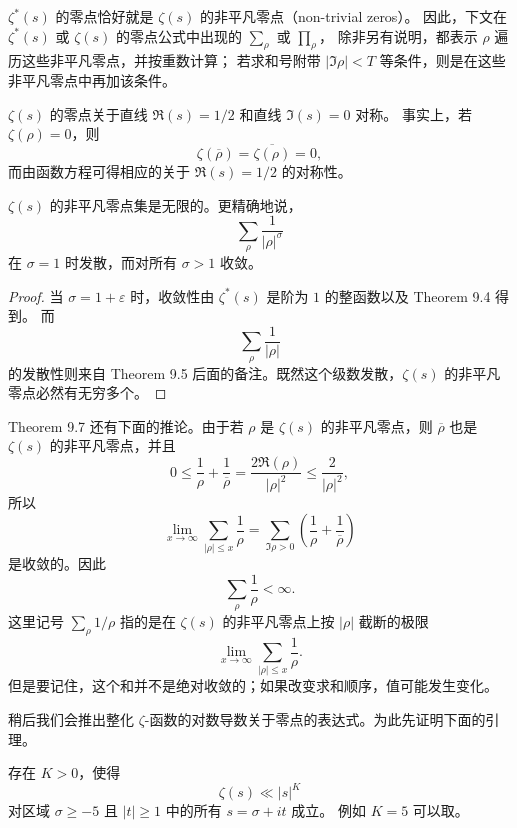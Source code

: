 \begin{remark}
	$\zeta^*(s)$ 的零点恰好就是 $\zeta(s)$ 的非平凡零点（non-trivial zeros）。
	因此，下文在 $\zeta^*(s)$ 或 $\zeta(s)$ 的零点公式中出现的 $\sum_\rho$ 或 $\prod_\rho$，
	除非另有说明，都表示 $\rho$ 遍历这些非平凡零点，并按重数计算；
	若求和号附带 $|\Im\rho|<T$ 等条件，则是在这些非平凡零点中再加该条件。
\end{remark}

\begin{remark}
	$\zeta(s)$ 的零点关于直线 $\Re(s)=1/2$ 和直线 $\Im(s)=0$ 对称。
	事实上，若 $\zeta(\rho)=0$，则
	\[
		\zeta(\overline{\rho})
		=
		\overline{\zeta(\rho)}
		=
		0,
	\]
	而由函数方程可得相应的关于 $\Re(s)=1/2$ 的对称性。
\end{remark}

\begin{theorem}[原文 Theorem 9.7]
	$\zeta(s)$ 的非平凡零点集是无限的。更精确地说，
	\[
		\sum_\rho \frac{1}{|\rho|^\sigma}
	\]
	在 $\sigma=1$ 时发散，而对所有 $\sigma>1$ 收敛。
\end{theorem}

\begin{proof}
	当 $\sigma=1+\varepsilon$ 时，收敛性由 $\zeta^*(s)$ 是阶为 $1$ 的整函数以及 Theorem 9.4 得到。
	而
	\[
		\sum_\rho \frac1{|\rho|}
	\]
	的发散性则来自 Theorem 9.5 后面的备注。既然这个级数发散，$\zeta(s)$ 的非平凡零点必然有无穷多个。
\end{proof}

Theorem 9.7 还有下面的推论。由于若 $\rho$ 是 $\zeta(s)$ 的非平凡零点，则
$\overline{\rho}$ 也是 $\zeta(s)$ 的非平凡零点，并且
\[
	0\leq
	\frac1{\rho}+\frac1{\overline{\rho}}
	=
	\frac{2\Re(\rho)}{|\rho|^2}
	\leq
	\frac{2}{|\rho|^2},
\]
所以
\[
	\lim_{x\to\infty}\sum_{|\rho|\leq x}\frac1{\rho}
	=
	\sum_{\Im\rho>0}\left(\frac1{\rho}+\frac1{\overline{\rho}}\right)
\]
是收敛的。因此
\[
	\sum_\rho \frac1{\rho}<\infty.
\]
这里记号 $\sum_\rho 1/\rho$ 指的是在 $\zeta(s)$ 的非平凡零点上按 $|\rho|$ 截断的极限
\[
	\lim_{x\to\infty}\sum_{|\rho|\leq x}\frac1{\rho}.
\]
但是要记住，这个和并不是绝对收敛的；如果改变求和顺序，值可能发生变化。

稍后我们会推出整化 $\zeta$-函数的对数导数关于零点的表达式。为此先证明下面的引理。

\begin{lemma}[原文 Lemma 9.8]
	存在 $K>0$，使得
	\[
		\zeta(s)\ll |s|^K
	\]
	对区域 $\sigma\geq -5$ 且 $|t|\geq 1$ 中的所有 $s=\sigma+it$ 成立。
	例如 $K=5$ 可以取。
\end{lemma}


